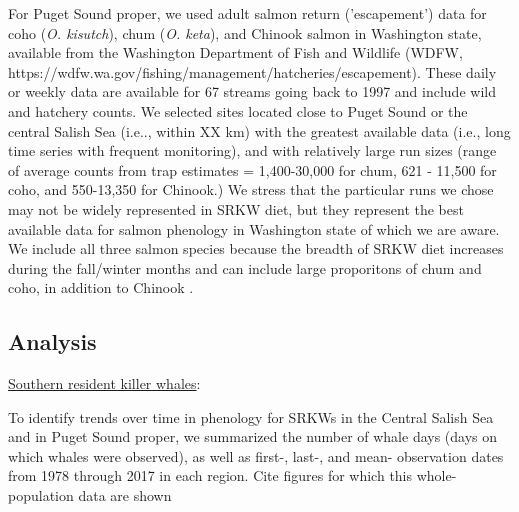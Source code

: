 \documentclass{article}
\begin{document}
\par For Puget Sound proper, we used adult salmon return ('escapement') data for coho (\emph{O. kisutch}), chum (\emph{O. keta}), and Chinook salmon in Washington state, available from the Washington Department of Fish and Wildlife (WDFW, https://wdfw.wa.gov/fishing/management/hatcheries/escapement). These daily or weekly  data are available for 67 streams going back to 1997 and include wild and hatchery counts. We selected sites located close to Puget Sound or the central Salish Sea (i.e.., within XX km) with the greatest available data (i.e., long time series with frequent monitoring), and with relatively large run sizes (range of average counts from trap estimates = 1,400-30,000 for chum, 621 - 11,500 for coho, and 550-13,350 for Chinook.) We stress that the particular runs we chose may not be widely represented in SRKW diet, but they represent the best available data for salmon phenology in Washington state of which we are aware. %
We  include all three salmon species because the breadth of SRKW diet increases during the fall/winter months and can include large proporitons of chum and coho, in addition to Chinook \citep{hanson2019,ford2016}.  

\subsection* {Analysis}
\underline{Southern resident killer whales}:
\par To identify trends over time in phenology for SRKWs in the Central Salish Sea and in Puget Sound proper, we summarized the number of whale days (days on which whales were observed), as well as first-, last-, and mean- observation dates from 1978 through 2017 in each region. Cite figures for which this whole-population data are shown
\end{document}

